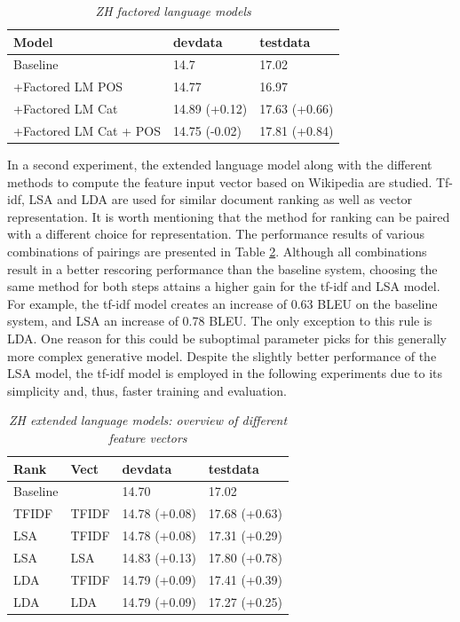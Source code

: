 \documentclass[a4paper]{article}
\begin{document}
\begin{table}
\caption{\it ZH factored language models}
\vspace{2mm}
\centering
  \begin{tabular}{ lll }
  	\hline
  	Model                  & devdata       & testdata      \\ \hline\hline
  	Baseline               & 14.7          & 17.02         \\
  	+Factored LM POS       & 14.77         & 16.97         \\ \hline
  	+Factored LM Cat       & 14.89 (+0.12) & 17.63 (+0.66) \\
  	+Factored LM Cat + POS & 14.75 (-0.02) & 17.81 (+0.84) \\ \hline
  \end{tabular}
  \label{tb:zh-factored}
\end{table}

In a second experiment, the extended language model along with the different methods to compute the feature input vector based on Wikipedia are studied. Tf-idf, LSA and LDA are used for similar document ranking as well as vector representation. It is worth mentioning that the method for ranking can be paired with a different choice for representation. The performance results of various combinations of pairings are presented in Table \ref{tb:zh-extended-diff-features}. Although all combinations result in a better rescoring performance than the baseline system, choosing the same method for both steps attains a higher gain for the tf-idf and LSA model. For example, the tf-idf model creates an increase of 0.63 BLEU on the baseline system, and LSA an increase of 0.78 BLEU. The only exception to this rule is LDA. One reason for this could be suboptimal parameter picks for this generally more complex generative model. Despite the slightly better performance of the LSA model, the tf-idf model is employed in the following experiments due to its simplicity and, thus, faster training and evaluation.

\begin{table}
\caption{\it ZH extended language models: overview of different feature vectors}
\vspace{2mm}
\centering
  \begin{tabular}{llll}
  	\hline
  	Rank     & Vect  & devdata       & testdata      \\ \hline\hline
  	Baseline &       & 14.70         & 17.02         \\ \hline
  	TFIDF    & TFIDF & 14.78 (+0.08) & 17.68 (+0.63) \\
  	LSA      & TFIDF & 14.78 (+0.08) & 17.31 (+0.29) \\
  	LSA      & LSA   & 14.83 (+0.13) & 17.80 (+0.78) \\
  	LDA      & TFIDF & 14.79 (+0.09) & 17.41 (+0.39) \\
  	LDA      & LDA   & 14.79 (+0.09) & 17.27 (+0.25)
  \end{tabular}
  \label{tb:zh-extended-diff-features}
\end{table}
\end{document}
